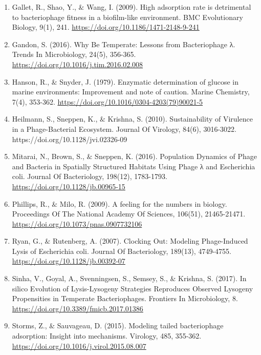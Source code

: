 \documentclass{article}
\begin{document}
\begin{enumerate}
\item	Gallet, R., Shao, Y., $\&$ Wang, I. (2009). High adsorption rate is detrimental to bacteriophage fitness in a biofilm-like environment. BMC Evolutionary Biology, 9(1), 241. \url{https://doi.org/10.1186/1471-2148-9-241} 

\item	Gandon, S. (2016). Why Be Temperate: Lessons from Bacteriophage λ. Trends In Microbiology, 24(5), 356-365. \url{https://doi.org/10.1016/j.tim.2016.02.008}

\item	Hanson, R., $\&$ Snyder, J. (1979). Enzymatic determination of glucose in marine environments: Improvement and note of caution. Marine Chemistry, 7(4), 353-362. \url{https://doi.org/10.1016/0304-4203(79)90021-5} 

\item	Heilmann, S., Sneppen, K., $\&$ Krishna, S. (2010). Sustainability of Virulence in a Phage-Bacterial Ecosystem. Journal Of Virology, 84(6), 3016-3022. https://doi.org/10.1128/jvi.02326-09

\item	Mitarai, N., Brown, S., $\&$ Sneppen, K. (2016). Population Dynamics of Phage and Bacteria in Spatially Structured Habitats Using Phage λ and Escherichia coli. Journal Of Bacteriology, 198(12), 1783-1793. \url{https://doi.org/10.1128/jb.00965-15}

\item	Phillips, R., $\&$ Milo, R. (2009). A feeling for the numbers in biology. Proceedings Of The National Academy Of Sciences, 106(51), 21465-21471. \url{https://doi.org/10.1073/pnas.0907732106}

\item	Ryan, G., $\&$ Rutenberg, A. (2007). Clocking Out: Modeling Phage-Induced Lysis of Escherichia coli. Journal Of Bacteriology, 189(13), 4749-4755. \url{https://doi.org/10.1128/jb.00392-07}

\item	Sinha, V., Goyal, A., Svenningsen, S., Semsey, S., $\&$ Krishna, S. (2017). In silico Evolution of Lysis-Lysogeny Strategies Reproduces Observed Lysogeny Propensities in Temperate Bacteriophages. Frontiers In Microbiology, 8. \url{https://doi.org/10.3389/fmicb.2017.01386}

\item	Storms, Z., $\&$ Sauvageau, D. (2015). Modeling tailed bacteriophage adsorption: Insight into mechanisms. Virology, 485, 355-362.
\url{https://doi.org/10.1016/j.virol.2015.08.007}


\end{enumerate}
\end{document}
